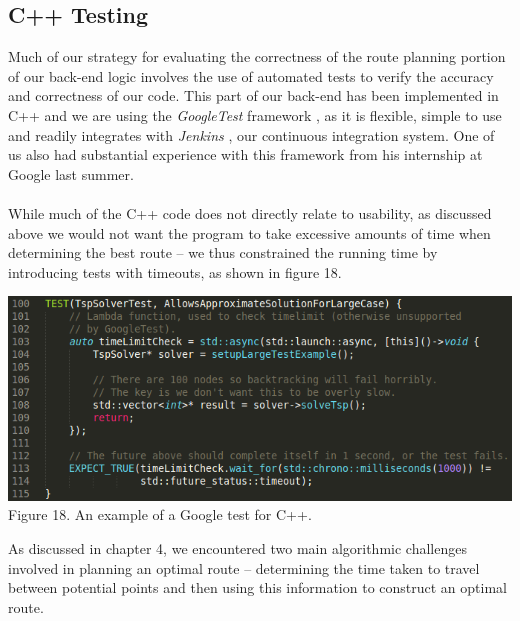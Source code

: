 \documentclass[a4paper, 10pt]{report}
\begin{document}
\subsection{C++ Testing}
Much of our strategy for evaluating the correctness of the route planning portion of our back-end logic involves the use of automated tests to verify the accuracy and correctness of our code. This part of our back-end has been implemented in C++ and we are using the \textit{GoogleTest} framework \cite{googletest}, as it is flexible, simple to use and readily integrates with \textit{Jenkins} \cite{jenkins}, our continuous integration system. One of us also had substantial experience with this framework from his internship at Google last summer.
\\\\While much of the C++ code does not directly relate to usability, as discussed above we would not want the program to take excessive amounts of time when determining the best route -- we thus constrained the running time by introducing tests with timeouts, as shown in figure 18.
\begin{center}
\includegraphics[scale=0.45]{google_test.png}\\
Figure 18. An example of a Google test for C++.
\end{center}
As discussed in chapter 4, we encountered two main algorithmic challenges involved in planning an optimal route -- determining the time taken to travel between potential points and then using this information to construct an optimal route.
\end{document}
